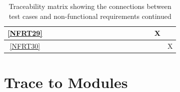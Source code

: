 \documentclass[12pt, titlepage]{article}
\begin{document}
\begin{landscape}
\begin{table}[h!]
\begin{tabular}{|c|c|c|c|c|c|c|c|c|c|c|c|c|c|c|c|c|c|}
      \ref{NFRT29} &      &      &     &     &     &     &     &     &     &     &     &     &     &     &     & X   &     \\ \hline
      \ref{NFRT30} &      &      &     &     &     &     &     &     &     &     &     &     &     &     &     &     & X   \\ \hline
    \end{tabular}
    \caption{Traceability matrix showing the connections between test cases
      and non-functional requirements continued}
    \label{tab:nfrt2}
  \end{table}
\end{landscape}
\restoregeometry

\section{Trace to Modules}
\end{document}
